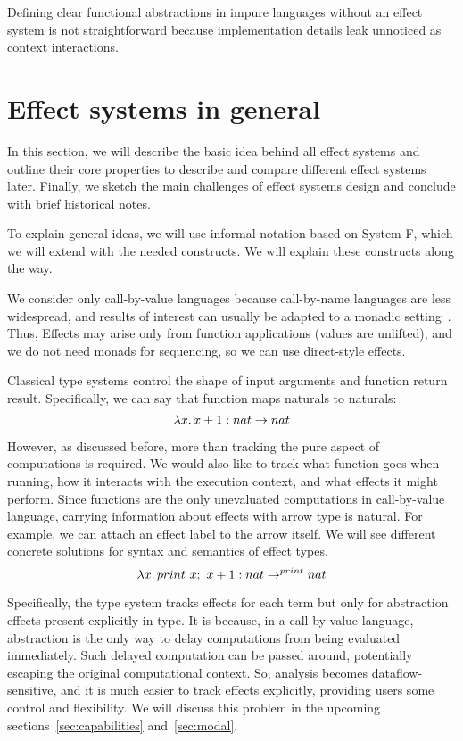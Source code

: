 \documentclass[conference]{IEEEtran}
\newcommand{\seq}{;~}
\newcommand{\ap}{~}
\begin{document}
    Defining clear functional abstractions in impure languages without an effect system is not straightforward because implementation details leak unnoticed as context interactions.


    \section{Effect systems in general}

    In this section, we will describe the basic idea behind all effect systems and outline their core properties to describe and compare different effect systems later.
    Finally, we sketch the main challenges of effect systems design and conclude with brief historical notes.

    To explain general ideas, we will use informal notation based on System F, which we will extend with the needed constructs.
    We will explain these constructs along the way.

    We consider only call-by-value languages because call-by-name languages are less widespread, and results of interest can usually be adapted to a monadic setting~\cite{wadler2003marriage}.
    Thus, Effects may arise only from function applications (values are unlifted), and we do not need monads for sequencing, so we can use direct-style effects.


    Classical type systems control the shape of input arguments and function return result.
    Specifically, we can say that function maps naturals to naturals:
    \[\lambda x\ldotp x + 1 : nat\to nat\]

    However, as discussed before, more than tracking the pure aspect of computations is required.
    We would also like to track what function goes when running, how it interacts with the execution context, and what effects it might perform.
    Since functions are the only unevaluated computations in call-by-value language, carrying information about effects with arrow type is natural.
    For example, we can attach an effect label to the arrow itself.
    We will see different concrete solutions for syntax and semantics of effect types.
    \[\lambda x\ldotp print \ap x\seq x + 1 : nat\to^{print} nat\]

    Specifically, the type system tracks effects for each term but only for abstraction effects present explicitly in type.
    It is because, in a call-by-value language, abstraction is the only way to delay computations from being evaluated immediately.
    Such delayed computation can be passed around, potentially escaping the original computational context.
    So, analysis becomes dataflow-sensitive, and it is much easier to track effects explicitly, providing users some control and flexibility.
    We will discuss this problem in the upcoming sections~\ref{sec:capabilities} and~\ref{sec:modal}.
\end{document}
